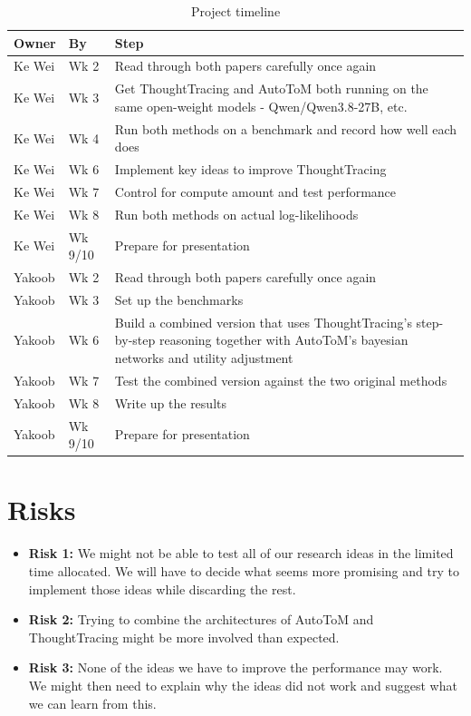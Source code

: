 \documentclass[11pt]{article}
\begin{document}
\begin{table}[h!]
\centering
\small
\begin{tabular}{@{}p{}p{}p{}@{}}
\toprule
\textbf{Owner} & \textbf{By} & \textbf{Step} \\
\midrule
Ke Wei   & Wk 2 & Read through both papers carefully once again  \\
Ke Wei   & Wk 3 & Get ThoughtTracing and AutoToM both running on the same open-weight models - Qwen/Qwen3.8-27B, etc. \\
Ke Wei   & Wk 4 & Run both methods on a benchmark and record how well each does \\
Ke Wei   & Wk 6 & Implement key ideas to improve ThoughtTracing\\
Ke Wei   & Wk 7 & Control for compute amount and test performance\\
Ke Wei   & Wk 8 & Run both methods on actual log-likelihoods  \\
Ke Wei   & Wk 9/10 & Prepare for presentation \\

\addlinespace
Yakoob   & Wk 2 & Read through both papers carefully once again  \\
Yakoob   & Wk 3 & Set up the benchmarks\\
Yakoob   & Wk 6 & Build a combined version that uses ThoughtTracing's step-by-step reasoning together with AutoToM's bayesian networks and utility adjustment\\
Yakoob   & Wk 7 & Test the combined version against the two original methods \\
Yakoob   & Wk 8 & Write up the results\\
Yakoob   & Wk 9/10 & Prepare for presentation \\
\bottomrule
\end{tabular}
\caption{Project timeline}
\end{table}


\section{Risks}

\begin{itemize}[leftmargin=*, itemsep=2pt]
    \item \textbf{Risk 1:} We might not be able to test all of our research ideas in the limited time allocated. We will have to decide what seems more promising and try to implement those ideas while discarding the rest. 
    \item \textbf{Risk 2:} Trying to combine the architectures of AutoToM and ThoughtTracing might be more involved than expected. 
    \item \textbf{Risk 3:   } None of the ideas we have to improve the performance may work. We might then need to explain why the ideas did not work and suggest what we can learn from this. 
\end{itemize}



\end{document}

